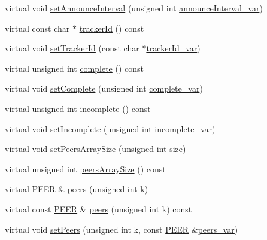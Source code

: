 \begin{DoxyCompactItemize}
\item 
virtual void \hyperlink{classBTTrackerMsgResponse_a124a7861f43c4fcc358889bf29720bca}{set\+Announce\+Interval} (unsigned int \hyperlink{classBTTrackerMsgResponse_a0e2fa84a47aa20e0f4a17de270b819c0}{announce\+Interval\+\_\+var})
\item 
virtual const char $\ast$ \hyperlink{classBTTrackerMsgResponse_abd9d7bcdaca8ef26dae5a28d8d08cb63}{tracker\+Id} () const 
\item 
virtual void \hyperlink{classBTTrackerMsgResponse_aaa640fe58c4c2b21e79393d597d26a26}{set\+Tracker\+Id} (const char $\ast$\hyperlink{classBTTrackerMsgResponse_a95d4eed6b7304f41ac4d967020ca5024}{tracker\+Id\+\_\+var})
\item 
virtual unsigned int \hyperlink{classBTTrackerMsgResponse_af9d26abf0691613825a557e58ccec54a}{complete} () const 
\item 
virtual void \hyperlink{classBTTrackerMsgResponse_a979ad2935b9b3cbae4fc54d9ed60c4a8}{set\+Complete} (unsigned int \hyperlink{classBTTrackerMsgResponse_a6631a0aa7c951abebf37fe5aa4ae4322}{complete\+\_\+var})
\item 
virtual unsigned int \hyperlink{classBTTrackerMsgResponse_ae0a062ad41a0d89fe1bdd17505d3f0a1}{incomplete} () const 
\item 
virtual void \hyperlink{classBTTrackerMsgResponse_aec9027a492cc165f6479841601c6c7f0}{set\+Incomplete} (unsigned int \hyperlink{classBTTrackerMsgResponse_aeec84d5b5adc2526912e05764b71fd3e}{incomplete\+\_\+var})
\item 
virtual void \hyperlink{classBTTrackerMsgResponse_a8059cb8ffd2c4bdbba6cc31e9d6b9a72}{set\+Peers\+Array\+Size} (unsigned int size)
\item 
virtual unsigned int \hyperlink{classBTTrackerMsgResponse_ad551cd9378c48865770ec0b2fa0c6874}{peers\+Array\+Size} () const 
\item 
virtual \hyperlink{structPEER}{P\+E\+E\+R} \& \hyperlink{classBTTrackerMsgResponse_aed995854e4280b5c8d1df47a07043ec1}{peers} (unsigned int k)
\item 
virtual const \hyperlink{structPEER}{P\+E\+E\+R} \& \hyperlink{classBTTrackerMsgResponse_a7bd58838c9f076780fc316e7b4972603}{peers} (unsigned int k) const 
\item 
virtual void \hyperlink{classBTTrackerMsgResponse_a11aa8270e8faf38a3605ebf55b791b95}{set\+Peers} (unsigned int k, const \hyperlink{structPEER}{P\+E\+E\+R} \&\hyperlink{classBTTrackerMsgResponse_a1aa01eb6c2c6a28498173d1d0f578b72}{peers\+\_\+var})
\end{DoxyCompactItemize}
